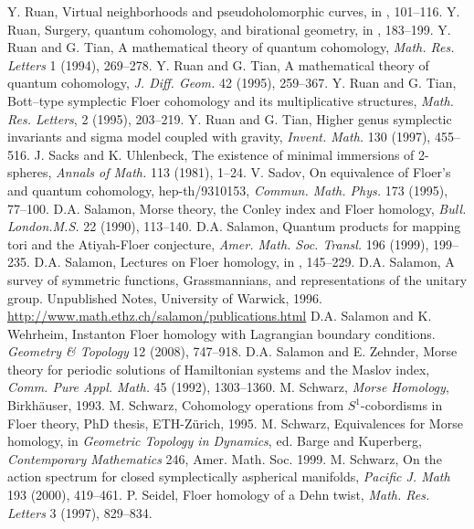  Y. Ruan, Virtual neighborhoods and pseudoholomorphic curves, in \cite{src-385}, 101--116.
 Y. Ruan, Surgery, quantum cohomology, and birational geometry, in \cite{src-99}, 183--199.
 Y. Ruan and G. Tian, A mathematical theory of quantum cohomology, \emph{Math. Res. Letters} 1 (1994), 269--278.
 Y. Ruan and G. Tian, A mathematical theory of quantum cohomology, \emph{J. Diff. Geom.} 42 (1995), 259--367.
 Y. Ruan and G. Tian, Bott--type symplectic Floer cohomology and its multiplicative structures, \emph{Math. Res. Letters}, 2 (1995), 203--219.
 Y. Ruan and G. Tian, Higher genus symplectic invariants and sigma model coupled with gravity, \emph{Invent. Math.} 130 (1997), 455--516.
 J. Sacks and K. Uhlenbeck, The existence of minimal immersions of 2-spheres, \emph{Annals of Math.} 113 (1981), 1--24.
 V. Sadov, On equivalence of Floer’s and quantum cohomology, hep-th/9310153, \emph{Commun. Math. Phys.} 173 (1995), 77--100.
 D.A. Salamon, Morse theory, the Conley index and Floer homology, \emph{Bull. London.M.S.} 22 (1990), 113--140.
 D.A. Salamon, Quantum products for mapping tori and the Atiyah-Floer conjecture, \emph{Amer. Math. Soc. Transl.} 196 (1999), 199--235.
 D.A. Salamon, Lectures on Floer homology, in \cite{src-103}, 145--229.
 D.A. Salamon, A survey of symmetric functions, Grassmannians, and representations of the unitary group. Unpublished Notes, University of Warwick, 1996. \url{http://www.math.ethz.ch/salamon/publications.html}
 D.A. Salamon and K. Wehrheim, Instanton Floer homology with Lagrangian boundary conditions. \emph{Geometry \& Topology} 12 (2008), 747--918.
 D.A. Salamon and E. Zehnder, Morse theory for periodic solutions of Hamiltonian systems and the Maslov index, \emph{Comm. Pure Appl. Math.} 45 (1992), 1303--1360.
 M. Schwarz, \emph{Morse Homology}, Birkhäuser, 1993.
 M. Schwarz, Cohomology operations from $S^1$-cobordisms in Floer theory, PhD thesis, ETH-Zürich, 1995.
 M. Schwarz, Equivalences for Morse homology, in \emph{Geometric Topology in Dynamics}, ed. Barge and Kuperberg, \emph{Contemporary Mathematics} 246, Amer. Math. Soc. 1999.
 M. Schwarz, On the action spectrum for closed symplectically aspherical manifolds, \emph{Pacific J. Math} 193 (2000), 419--461.
 P. Seidel, Floer homology of a Dehn twist, \emph{Math. Res. Letters} 3 (1997), 829--834.
